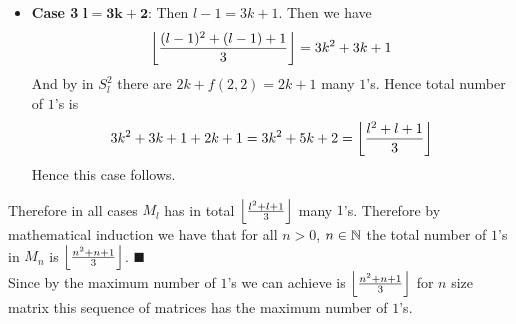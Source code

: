 \documentclass[a4paper, 11pt]{article}
\renewenvironment{proof}{\noindent{\it \textbf{Proof:}}\hspace*{1em}}{\hfill $\blacksquare$\bigskip\\}
\begin{document}
{\begin{proof}
\begin{itemize}[label=$\bullet$]
		\item \textbf{Case 3} $\boldsymbol{l=3k+2}$: Then $l-1=3k+1$. Then we have $$\left\lfloor \frac{(l-1)^2+(l-1)+1}{3}\right\rfloor=3k^2+3k+1$$And by  in $S_l^2$ there are $2k+f(2,2)=2k+1$ many $1$'s. Hence total number of $1$'s is $$3k^2+3k+1+2k+1=3k^2+5k+2=\left\lfloor \frac{l^2+l+1}{3}\right\rfloor$$Hence this case follows.
	\end{itemize}
	Therefore in all cases $M_l$ has in total $\left\lfloor \frac{l^2+l+1}{3}\right\rfloor$ many $1$'s. Therefore by mathematical induction we have that for all $n>0$, $n\in\mathbb{N}$ the total number of $1$'s in $M_n$ is $\left\lfloor \frac{n^2+n+1}{3}\right\rfloor$.
\end{proof}
Since by  the maximum number of $1$'s we can achieve is $\left\lfloor \frac{n^2+n+1}{3}\right\rfloor$ for $n$ size matrix this sequence of matrices has the maximum number of $1$'s. 
}


\end{document}
